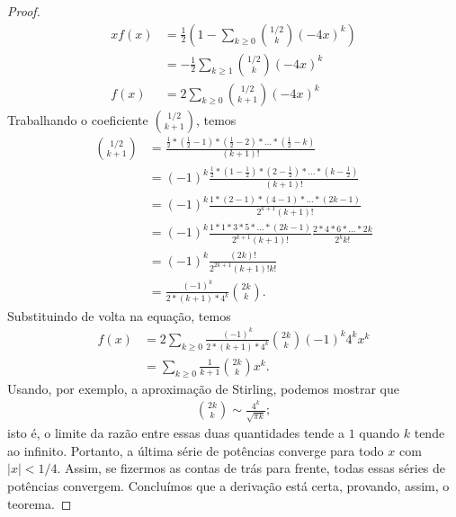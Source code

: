 \begin{proof}
    \begin{align*}
        xf(x) &= \frac 1 2 \left( 1 - \sum_{k \geq 0} \binom{1/2}{k} (-4x)^k \right) \\
              &= -\frac 1 2 \sum_{k \geq 1} \binom{1/2}{k} (-4x)^k \\
        f(x) &= 2 \sum_{k \geq 0} \binom{1/2}{k+1} (-4x)^k
    \end{align*}
    Trabalhando o coeficiente $\binom{1/2}{k+1}$, temos
    \begin{align*}
        \binom{1/2}{k+1} &= \frac{
            \frac 1 2 * (\frac 1 2 - 1) * (\frac 1 2 - 2) * \dots * (\frac 1 2 - k)
        }{ (k+1)! } \\
        &= (-1)^k \frac{
            \frac 1 2 * (1 - \frac 1 2) * (2 - \frac 1 2) * \dots * (k - \frac 1 2)
        }{ (k+1)! } \\
        &= (-1)^k \frac{
            1 * (2 - 1) * (4 - 1) * \dots * (2k - 1)
        }{ 2^{k + 1} (k + 1)! } \\
        &= (-1)^k \frac{ 1 * 1 * 3 * 5 * \dots * (2k - 1) }{2^{k+1} (k+1)!}
            \frac{2 * 4 * 6 * \dots * 2k}{2^k k!} \\
        &= (-1)^k \frac{ (2k)! }{2^{2k+1} (k+1)! k!} \\
        &= \frac{(-1)^k}{2 * (k+1) * 4^k} \binom{2k}{k}.
    \end{align*}
    Substituindo de volta na equação, temos
    \begin{align*}
        f(x) &= 2\sum_{k \geq 0}
            \frac{(-1)^k}{2*(k+1) * 4^k} \binom{2k}{k} (-1)^k 4^k x^k \\
            &= \sum_{k \geq 0} \frac 1 {k+1} \binom{2k} k x^k.
    \end{align*}
    Usando, por exemplo,
    a aproximação de Stirling,
    podemos mostrar que
    \begin{align*}
        \binom{2k} k \sim \frac{4^k}{\sqrt{\pi k}};
    \end{align*}
    isto é, o limite da razão entre essas duas quantidades tende a $1$
    quando $k$ tende ao infinito.
    Portanto, a última série de potências converge para todo $x$ com $|x| < 1/4$.
    Assim, se fizermos as contas de trás para frente,
    todas essas séries de potências convergem.
    Concluímos que a derivação está certa,
    provando, assim, o teorema.
\end{proof}
